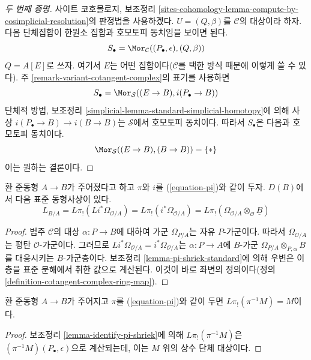 \begin{proof}[두 번째 증명]
사이트 코호몰로지, 보조정리
\ref{sites-cohomology-lemma-compute-by-cosimplicial-resolution}의 판정법을
사용하겠다. $U=(Q,\beta)$를 $\mathcal{C}$의 대상이라 하자. 다음
단체집합이 한원소 집합과 호모토피 동치임을 보이면 된다.
$$
S_\bullet = \Mor_\mathcal{C}((P_\bullet, \epsilon), (Q, \beta))
$$
$Q=A[E]$로 쓰자. 여기서 $E$는 어떤 집합이다($\mathcal{C}$를 택한 방식
때문에 이렇게 쓸 수 있다). 주 \ref{remark-variant-cotangent-complex}의
표기를 사용하면
$$
S_\bullet = \Mor_\mathcal{S}((E \to B), i(P_\bullet \to B))
$$
단체적 방법, 보조정리
\ref{simplicial-lemma-standard-simplicial-homotopy}에 의해 사상
$i(P_\bullet\to B)\to i(B\to B)$는 $\mathcal{S}$에서 호모토피 동치이다.
따라서 $S_\bullet$은 다음과 호모토피 동치이다.
$$
\Mor_\mathcal{S}((E \to B), (B \to B)) = \{*\}
$$
이는 원하는 결론이다.
\end{proof}

\begin{lemma}
\label{lemma-compute-cotangent-complex}
환 준동형 $A\to B$가 주어졌다고 하고 $\pi$와 $i$를
(\ref{equation-pi})와 같이 두자. $D(B)$에서 다음 표준 동형사상이 있다.
$$
L_{B/A} = L\pi_!(Li^*\Omega_{\mathcal{O}/A}) =
L\pi_!(i^*\Omega_{\mathcal{O}/A}) =
L\pi_!(\Omega_{\mathcal{O}/A} \otimes_\mathcal{O} \underline{B})
$$
\end{lemma}

\begin{proof}
범주 $\mathcal{C}$의 대상 $\alpha:P\to B$에 대하여 가군
$\Omega_{P/A}$는 자유 $P$-가군이다. 따라서
$\Omega_{\mathcal{O}/A}$는 평탄 $\mathcal{O}$-가군이다. 그러므로
$Li^*\Omega_{\mathcal{O}/A}=i^*\Omega_{\mathcal{O}/A}$는
$\alpha:P\to A$에 $B$-가군
$\Omega_{P/A}\otimes_{P,\alpha}B$를 대응시키는
$\underline{B}$-가군층이다. 보조정리 \ref{lemma-pi-shriek-standard}에
의해 우변은 이 층을 표준 분해에서 취한 값으로 계산된다. 이것이 바로
좌변의 정의이다(정의 \ref{definition-cotangent-complex-ring-map}).
\end{proof}

\begin{lemma}
\label{lemma-pi-lower-shriek-constant-sheaf}
환 준동형 $A\to B$가 주어지고 $\pi$를 (\ref{equation-pi})와 같이 두면
$L\pi_!(\pi^{-1}M)=M$이다.
\end{lemma}

\begin{proof}
보조정리 \ref{lemma-identify-pi-shriek}에 의해
$L\pi_!(\pi^{-1}M)$은 $(\pi^{-1}M)(P_\bullet,\epsilon)$으로 계산되는데,
이는 $M$ 위의 상수 단체 대상이다.
\end{proof}

